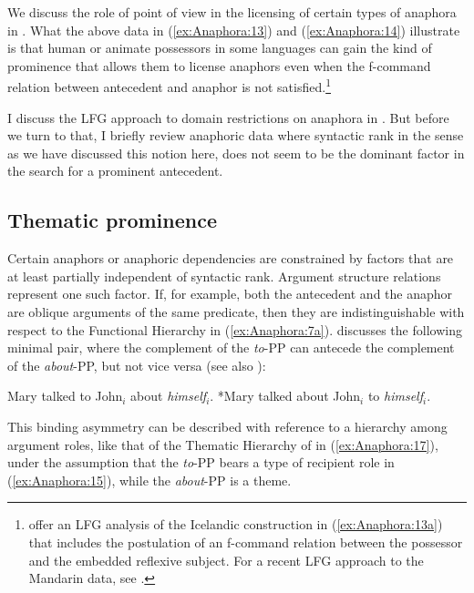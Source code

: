 \documentclass[output=paper,hidelinks]{langscibook}
\begin{document}
\noindent We discuss the role of point of view in the licensing of certain types of anaphora in . What the above data in (\ref{ex:Anaphora:13}) and (\ref{ex:Anaphora:14}) illustrate is that human or animate possessors in some languages can gain the kind of prominence that allows them to license anaphors even when the f-command relation between antecedent and anaphor is not satisfied.\footnote{\citet[268]{BresnanEtAl2016} offer an LFG analysis of the Icelandic construction in (\ref{ex:Anaphora:13a}) that includes the postulation of an f-command relation between the possessor and the embedded reflexive subject. For a recent LFG approach to the Mandarin data, see \citet{Lam2021-rq}.}

I discuss the LFG approach to domain restrictions on anaphora in . But before we turn to that, I briefly review anaphoric data where syntactic rank in the sense as we have discussed this notion here, does not seem to be the dominant factor in the search for a prominent antecedent.

\subsection{Thematic prominence}
\label{sec:Anaphora:2.2}

Certain anaphors or anaphoric dependencies are constrained by factors that are at least partially independent of syntactic rank. Argument structure relations represent one such factor.  If, for example, both the antecedent and the anaphor are oblique arguments of the same predicate, then they are indistinguishable with respect to the Functional Hierarchy in (\ref{ex:Anaphora:7a}). \citet[154]{dalrymple1993} discusses the following minimal pair, where the complement of the \emph{to}-PP can antecede the complement of the \emph{about}-PP, but not vice versa (see also \citealt[266]{Pollard1992-cv}):

\ea\label{ex:Anaphora:15}
\ea\label{ex:Anaphora:15a} Mary talked to John$_i$ about \emph{himself}$_i$.
\ex\label{ex:Anaphora:15b} *Mary talked about John$_i$ to \emph{himself}$_i$.
\z\z

\noindent This binding asymmetry can be described with reference to a hierarchy among argument roles, like that of the Thematic Hierarchy of \citet{bresnan1989locative} in (\ref{ex:Anaphora:17}), under the assumption that the \textit{to}-PP bears a type of recipient role in (\ref{ex:Anaphora:15}), while the \textit{about}-PP is a theme.
\end{document}
